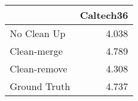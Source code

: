 \begin{tabular}{lr}
\toprule
{} & Caltech36 \\
\midrule
No Clean Up  &     4.038 \\
Clean-merge  &     4.789 \\
Clean-remove &     4.308 \\
Ground Truth &     4.737 \\
\bottomrule
\end{tabular}

